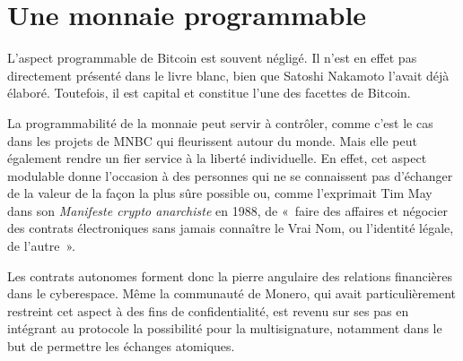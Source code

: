 \section*{Une monnaie programmable}

L'aspect programmable de Bitcoin est souvent négligé. Il n'est en effet pas directement présenté dans le livre blanc, bien que Satoshi Nakamoto l'avait déjà élaboré. Toutefois, il est capital et constitue l'une des facettes de Bitcoin.

La programmabilité de la monnaie peut servir à contrôler, comme c'est le cas dans les projets de MNBC qui fleurissent autour du monde. Mais elle peut également rendre un fier service à la liberté individuelle. En effet, cet aspect modulable donne l'occasion à des personnes qui ne se connaissent pas d'échanger de la valeur de la façon la plus sûre possible ou, comme l'exprimait Tim May dans son \emph{Manifeste crypto anarchiste} en 1988, de «~faire des affaires et négocier des contrats électroniques sans jamais connaître le Vrai Nom, ou l'identité légale, de l'autre~».

Les contrats autonomes forment donc la pierre angulaire des relations financières dans le cyberespace. Même la communauté de Monero, qui avait particulièrement restreint cet aspect à des fins de confidentialité, est revenu sur ses pas en intégrant au protocole la possibilité pour la multisignature, notamment dans le but de permettre les échanges atomiques.